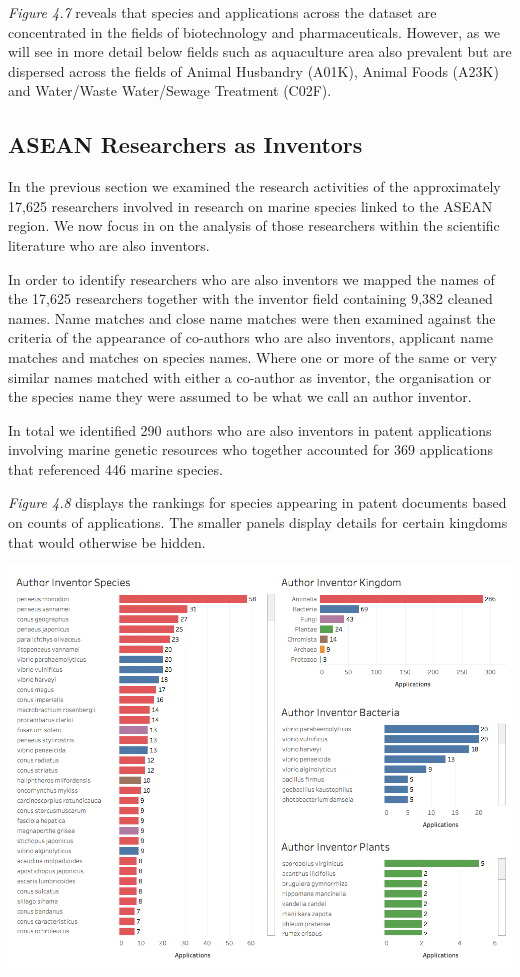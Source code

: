 \documentclass[]{book}
\theoremstyle{definition}
\theoremstyle{definition}
\theoremstyle{definition}
\theoremstyle{remark}
\begin{document}
\emph{Figure 4.7} reveals that species and applications across the
dataset are concentrated in the fields of biotechnology and
pharmaceuticals. However, as we will see in more detail below fields
such as aquaculture area also prevalent but are dispersed across the
fields of Animal Husbandry (A01K), Animal Foods (A23K) and Water/Waste
Water/Sewage Treatment (C02F).

\hypertarget{asean-researchers-as-inventors}{%
\subsection{ASEAN Researchers as
Inventors}\label{asean-researchers-as-inventors}}

In the previous section we examined the research activities of the
approximately 17,625 researchers involved in research on marine species
linked to the ASEAN region. We now focus in on the analysis of those
researchers within the scientific literature who are also inventors.

In order to identify researchers who are also inventors we mapped the
names of the 17,625 researchers together with the inventor field
containing 9,382 cleaned names. Name matches and close name matches were
then examined against the criteria of the appearance of co-authors who
are also inventors, applicant name matches and matches on species names.
Where one or more of the same or very similar names matched with either
a co-author as inventor, the organisation or the species name they were
assumed to be what we call an author inventor.

In total we identified 290 authors who are also inventors in patent
applications involving marine genetic resources who together accounted
for 369 applications that referenced 446 marine species.

\emph{Figure 4.8} displays the rankings for species appearing in patent
documents based on counts of applications. The smaller panels display
details for certain kingdoms that would otherwise be hidden.

\includegraphics[width=13.89in]{images-patents/author_inventor_species_dashboard}
\end{document}

